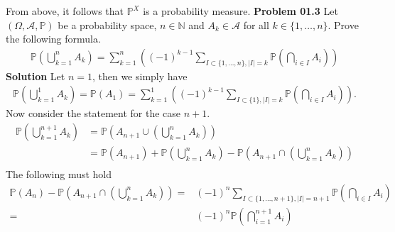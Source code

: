 \documentclass[a4paper]{book}
\theoremstyle{definition}
\begin{document}
From above, it follows that \(\mathbb{P}^X\) is a probability measure.
\newpage
\noindent\textbf{Problem 01.3}
Let \((\Omega, \mathcal{A}, \mathbb{P})\) be a probability space, \(n \in \mathbb{N}\) and \(A_k \in \mathcal{A}\) for all \(k \in \{1, \dots, n\}\). Prove the following formula.
\begin{align}
    \mathbb{P} \left( \bigcup_{k=1}^n A_k \right) = \sum_{k = 1}^n \left( (-1)^{k-1} \sum_{I \subset \{1, \dots, n\}, |I| = k } \mathbb{P} \left( \bigcap_{i \in I} A_i \right) \right)
\end{align}
\newline
\newline
\textbf{Solution}
Let \(n = 1\), then we simply have
\begin{align}
    \mathbb{P} \left( \bigcup_{k = 1}^1 A_k \right) = \mathbb{P} (A_1) = \sum_{k = 1}^1 \left( (-1)^{k-1} \sum_{I \subset \{1\}, |I| = k } \mathbb{P} \left( \bigcap_{i \in I} A_i \right) \right) \text{.}
\end{align}
Now consider the statement for the case \(n + 1\).
\begin{align}
    \mathbb{P} \left( \bigcup_{k=1}^{n+1} A_k \right) &= \mathbb{P} \left( A_{n+1} \cup \left( \bigcup_{k=1}^{n} A_k \right) \right) \\
    &= \mathbb{P} (A_{n+1}) + \mathbb{P} \left( \bigcup_{k=1}^{n} A_k \right) - \mathbb{P} \left( A_{n+1} \cap \left( \bigcup_{k=1}^{n} A_k \right) \right) \\
\end{align}
The following must hold
\begin{align}
    \mathbb{P}(A_n) - \mathbb{P} \left( A_{n+1} \cap \left( \bigcup_{k=1}^{n} A_k \right) \right) =& (-1)^n \sum_{I \subset \{1, \dots, n+1\}, |I| = n+1} \mathbb{P} \left( \bigcap_{i \in I} A_i \right)\\
    =& (-1)^{n} \mathbb{P} \left( \bigcap_{i=1}^{n+1} A_i \right)
\end{align}
\end{document}
